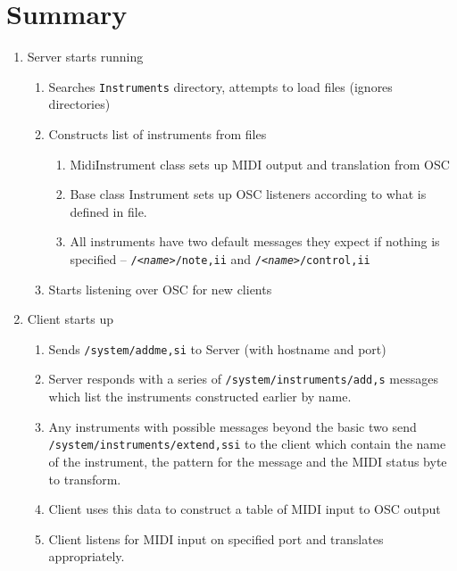 \documentclass[11pt]{article}
\begin{document}
\raggedright
\section*{Summary}
\begin{enumerate}[\bf1.]
	\item Server starts running
	\begin{enumerate} [\bf a.]
		\item Searches \texttt{Instruments} directory, attempts to load files (ignores directories)
		\item Constructs list of instruments from files
		\begin{enumerate}
			\item MidiInstrument class sets up MIDI output and translation from OSC
			\item Base class Instrument sets up OSC listeners according to what is defined in file.
			\item All instruments have two default messages they expect if nothing is specified -- \texttt{/\textit{<name>}/note,ii} and 
				 \texttt{/\textit{<name>}/control,ii} 
		\end{enumerate}
		\item Starts listening over OSC for new clients
	 \end{enumerate}
	 \item Client starts up
	 \begin{enumerate} [\bf a.]
	 	\item Sends \texttt{/system/addme,si} to Server (with hostname and port)
		\item Server responds with a series of \texttt{/system/instruments/add,s} messages which list the instruments constructed earlier by name.
		\item Any instruments with possible messages beyond the basic two send
			 \texttt{/system/instruments/extend,ssi} to the client
			which contain the name of the instrument, the pattern for the message and the MIDI status byte to transform.
		\item Client uses this data to construct a table of MIDI input to OSC output
		\item Client listens for MIDI input on specified port and translates appropriately.
	 \end{enumerate}
\end{enumerate}
\end{document}
